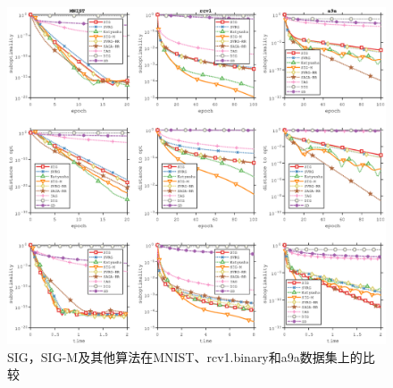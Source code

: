   \frame
  {
    \frametitle{\subsecname~ }
    \footnotesize

    \begin{figure}[H]
      \includegraphics[trim={3.5cm 23cm 3.5cm 2cm},clip,width=11.5cm]{data/img/figure3}
      \caption{SIG，SIG-M及其他算法在MNIST、rcv1.binary和a9a数据集上的比较}
    \end{figure}

}
